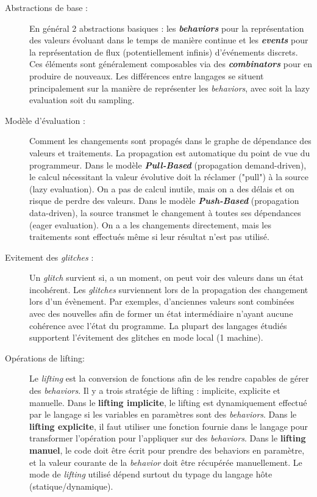 \documentclass[10pt,final]{IEEEtran}
\begin{document}
\begin{description}
    \item[Abstractions de base :]
    En général 2 abstractions basiques : les \textbf{\textit{behaviors}} pour la représentation des valeurs évoluant dans le temps de manière continue et les \textbf{\textit{events}} pour la représentation de flux (potentiellement infinis) d'événements discrets. Ces éléments sont généralement composables via des \textbf{\textit{combinators}} pour en produire de nouveaux. Les différences entre langages se situent principalement sur la manière de représenter les \textit{behaviors}, avec soit la lazy evaluation soit du sampling.
    
    \item[Modèle d'évaluation :]
    Comment les changements sont propagés dans le graphe de dépendance des valeurs et traitements. La propagation est automatique du point de vue du programmeur. Dans le modèle \textbf{\textit{Pull-Based}} (propagation demand-driven), le calcul nécessitant la valeur évolutive doit la réclamer ("pull") à la source (lazy evaluation). On a pas de calcul inutile, mais on a des délais et on risque de perdre des valeurs. Dans le modèle \textbf{\textit{Push-Based}} (propagation data-driven), la source transmet le changement à toutes ses dépendances (eager evaluation). On a a les changements directement, mais les traitements sont effectués même si leur résultat n'est pas utilisé.
    
    \item[Evitement des \textit{glitches} :]
    Un \textit{glitch} survient si, a un moment, on peut voir des valeurs dans un état incohérent. Les \textit{glitches} surviennent lors de la propagation des changement lors d'un évènement. Par exemples, d'anciennes valeurs sont combinées avec des nouvelles afin de former un état intermédiaire n'ayant aucune cohérence avec l'état du programme. La plupart des langages étudiés supportent l'évitement des glitches en mode local (1 machine).
    
    \item[Opérations de lifting:]
    Le \textit{lifting} est la conversion de fonctions afin de les rendre capables de gérer des \textit{behaviors}. Il y a trois stratégie de lifting : implicite, explicite et manuelle. Dans le \textbf{lifting implicite}, le lifting est dynamiquement effectué par le langage si les variables en paramètres sont des \textit{behaviors}. Dans le \textbf{lifting explicite}, il faut utiliser une fonction fournie dans le langage pour transformer l'opération pour l'appliquer sur des \textit{behaviors}. Dans le \textbf{lifting manuel}, le code doit être écrit pour prendre des behaviors en paramètre, et la valeur courante de la \textit{behavior} doit être récupérée manuellement. Le mode de \textit{lifting} utilisé dépend surtout du typage du langage hôte (statique/dynamique).
    

\end{description}
\end{document}
